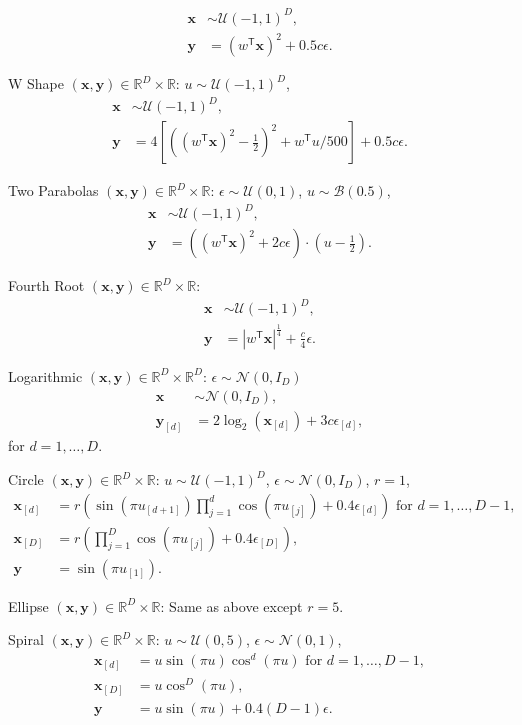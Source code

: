 \documentclass[11pt]{article}
\providecommand{\mb}[1]{\boldsymbol{#1}}
\providecommand{\mc}[1]{\mathcal{#1}}
\newcommand{\Real}{\mathbb{R}}
\newcommand{\T}{^{\ensuremath{\mathsf{T}}}}           %
\begin{document}
\begin{compactenum}
\begin{align*}
\mb{x} &\sim \mc{U}(-1,1)^{D},\\
\mb{y}&=(w\T \mb{x})^2+0.5c\epsilon.
\end{align*}
\item W Shape $(\mb{x},\mb{y}) \in \Real^{D} \times \Real$:  $u \sim \mc{U}(-1,1)^{D}$,
\begin{align*}
\mb{x} &\sim \mc{U}(-1,1)^{D},\\
\mb{y}&=4\left[ \left( (w\T \mb{x})^2 - \tfrac{1}{2} \right)^2 + w\T u/500 \right]+0.5c\epsilon.
\end{align*}
\item Two Parabolas $(\mb{x},\mb{y}) \in \Real^{D} \times \Real$: $\epsilon \sim \mc{U}(0,1)$, $u \sim \mc{B}(0.5)$,
\begin{align*}
\mb{x} &\sim \mc{U}(-1,1)^{D},\\
\mb{y}&=\left( (w\T \mb{x})^2  + 2c\epsilon\right) \cdot (u-\tfrac{1}{2}).
\end{align*}
\item Fourth Root $(\mb{x},\mb{y}) \in \Real^{D} \times \Real$:
\begin{align*}
\mb{x} &\sim \mc{U}(-1,1)^{D},\\
\mb{y}&=|w\T \mb{x}|^\frac{1}{4}+\frac{c}{4}\epsilon.
\end{align*}
\item Logarithmic $(\mb{x},\mb{y}) \in \Real^{D} \times \Real^{D}$: $\epsilon \sim \mc{N}(0, I_{D})$
\begin{align*}
\mb{x} &\sim \mc{N}(0, I_{D}),\\
\mb{y}_{[d]}&=2\log_{2}(\mb{x}_{[d]})+3c\epsilon_{[d]},
\end{align*}
for $d=1,\ldots,D$.
\item Circle $(\mb{x},\mb{y}) \in \Real^{D} \times \Real$: $u \sim \mc{U}(-1,1)^{D}$, $\epsilon \sim \mc{N}(0, I_{D})$, $r=1$,
\begin{align*}
\mb{x}_{[d]}&=r \left(\sin(\pi u_{[d+1]})  \prod_{j=1}^{d} \cos(\pi u_{[j]})+0.4 \epsilon_{[d]}\right) \mbox{ for $d=1,\ldots,D-1$},\\
\mb{x}_{[D]}&=r \left(\prod_{j=1}^{D} \cos(\pi u_{[j]})+0.4 \epsilon_{[D]}\right),\\
\mb{y}&= \sin(\pi u_{[1]}).
\end{align*}
\item Ellipse $(\mb{x},\mb{y}) \in \Real^{D} \times \Real$: Same as above except $r=5$.

\item Spiral $(\mb{x},\mb{y}) \in \Real^{D} \times \Real$: $u \sim \mc{U}(0,5)$, $\epsilon \sim \mc{N}(0, 1)$,
\begin{align*}
\mb{x}_{[d]}&=u \sin(\pi u)  \cos^{d}(\pi u) \mbox{ for $d=1,\ldots,D-1$},\\
\mb{x}_{[D]}&=u \cos^{D}(\pi u),\\
\mb{y}&= u \sin(\pi u) +0.4 (D-1)\epsilon.
\end{align*}


\end{compactenum}
\end{document}
